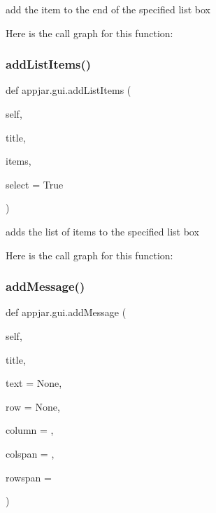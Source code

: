 \begin{DoxyVerb}add the item to the end of the specified list box \end{DoxyVerb}
 Here is the call graph for this function\+:
\mbox{\label{classappjar_1_1gui_aa26a393c3ae78854d25281a198a8b67a}} 
\subsubsection{\texorpdfstring{add\+List\+Items()}{addListItems()}}
{\footnotesize\ttfamily def appjar.\+gui.\+add\+List\+Items (\begin{DoxyParamCaption}\item[{}]{self,  }\item[{}]{title,  }\item[{}]{items,  }\item[{}]{select = {\ttfamily True} }\end{DoxyParamCaption})}

\begin{DoxyVerb}adds the list of items to the specified list box \end{DoxyVerb}
 Here is the call graph for this function\+:
\mbox{\label{classappjar_1_1gui_a0aab530d16cb1f1affd1fa70da523637}} 
\subsubsection{\texorpdfstring{add\+Message()}{addMessage()}}
{\footnotesize\ttfamily def appjar.\+gui.\+add\+Message (\begin{DoxyParamCaption}\item[{}]{self,  }\item[{}]{title,  }\item[{}]{text = {\ttfamily None},  }\item[{}]{row = {\ttfamily None},  }\item[{}]{column = {},  }\item[{}]{colspan = {},  }\item[{}]{rowspan = {} }\end{DoxyParamCaption})}

